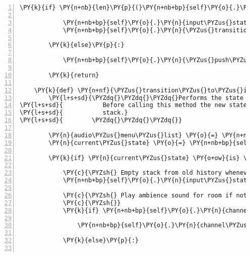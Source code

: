 \begin{Verbatim}[commandchars=\\\{\},numbers=left,firstnumber=1,stepnumber=1]
        \PY{k}{if} \PY{n+nb}{len}\PY{p}{(}\PY{n+nb+bp}{self}\PY{o}{.}\PY{n}{input\PYZus{}state\PYZus{}stack}\PY{p}{)} \PY{o}{\PYZgt{}} \PY{l+m+mi}{0}\PY{p}{:}

            \PY{n+nb+bp}{self}\PY{o}{.}\PY{n}{input\PYZus{}state\PYZus{}stack}\PY{o}{.}\PY{n}{pop}\PY{p}{(}\PY{p}{)}
            \PY{n+nb+bp}{self}\PY{o}{.}\PY{n}{\PYZus{}transition\PYZus{}to\PYZus{}input\PYZus{}state}\PY{p}{(}\PY{p}{)}

        \PY{k}{else}\PY{p}{:}

            \PY{n+nb+bp}{self}\PY{o}{.}\PY{n}{\PYZus{}push\PYZus{}input\PYZus{}state\PYZus{}on\PYZus{}stack}\PY{p}{(}\PY{n+nb+bp}{self}\PY{o}{.}\PY{n}{INPUT\PYZus{}STATE\PYZus{}IN\PYZus{}ROOM}\PY{p}{)}

        \PY{k}{return}

    \PY{k}{def} \PY{n+nf}{\PYZus{}transition\PYZus{}to\PYZus{}input\PYZus{}state}\PY{p}{(}\PY{n+nb+bp}{self}\PY{p}{)}\PY{p}{:}
        \PY{l+s+sd}{\PYZdq{}\PYZdq{}\PYZdq{}Performs the state transition from the former input state to the topmost input state.}
\PY{l+s+sd}{           Before calling this method the new state has to be pushed on the}
\PY{l+s+sd}{           stack.}
\PY{l+s+sd}{        \PYZdq{}\PYZdq{}\PYZdq{}}

        \PY{n}{audio\PYZus{}menu\PYZus{}list} \PY{o}{=} \PY{n+nb+bp}{None}
        \PY{n}{current\PYZus{}state} \PY{o}{=} \PY{n+nb+bp}{self}\PY{o}{.}\PY{n}{input\PYZus{}state\PYZus{}stack}\PY{p}{[}\PY{o}{\PYZhy{}}\PY{l+m+mi}{1}\PY{p}{]}

        \PY{k}{if} \PY{n}{current\PYZus{}state} \PY{o+ow}{is} \PY{n+nb+bp}{self}\PY{o}{.}\PY{n}{INPUT\PYZus{}STATE\PYZus{}IN\PYZus{}ROOM}\PY{p}{:}

            \PY{c}{\PYZsh{} Empty stack from old history whenever in room}
            \PY{n+nb+bp}{self}\PY{o}{.}\PY{n}{input\PYZus{}state\PYZus{}stack} \PY{o}{=} \PY{p}{[}\PY{n+nb+bp}{self}\PY{o}{.}\PY{n}{INPUT\PYZus{}STATE\PYZus{}IN\PYZus{}ROOM}\PY{p}{]}

            \PY{c}{\PYZsh{} Play ambience sound for room if not already playing}
            \PY{c}{\PYZsh{}}
            \PY{k}{if} \PY{n+nb+bp}{self}\PY{o}{.}\PY{n}{channel\PYZus{}ambience}\PY{o}{.}\PY{n}{get\PYZus{}busy}\PY{p}{(}\PY{p}{)}\PY{p}{:}

                \PY{n+nb+bp}{self}\PY{o}{.}\PY{n}{channel\PYZus{}ambience}\PY{o}{.}\PY{n}{unpause}\PY{p}{(}\PY{p}{)}

            \PY{k}{else}\PY{p}{:}


\end{Verbatim}
